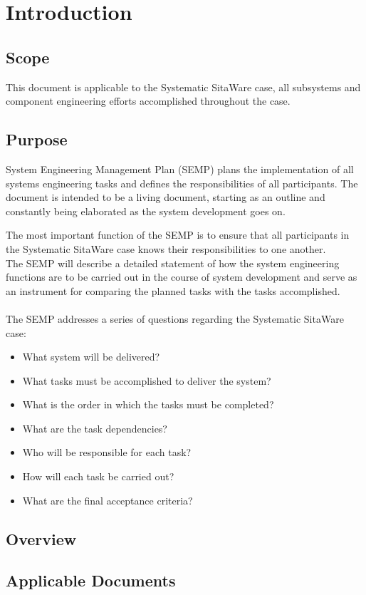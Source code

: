 %
\thispagestyle{fancy}
\chapter{Introduction}
\label{chp:intro}


\section{Scope}
This document is applicable to the Systematic SitaWare case, all subsystems and component engineering efforts accomplished throughout the case.

\section{Purpose}
System Engineering Management Plan (SEMP) plans the implementation of all systems engineering tasks and defines the responsibilities of all participants.
The document is intended to be a living document, starting as an outline and constantly being elaborated as the system development goes on.

The most important function of the SEMP is to ensure that all participants in the Systematic SitaWare case knows their responsibilities to one another. \\
The SEMP will describe a detailed statement of how the system engineering functions are to be carried out in the course of system development and serve as an instrument for comparing the planned tasks with the tasks accomplished.\\\\
The SEMP addresses a series of questions regarding the Systematic SitaWare case:
\begin{itemize}
    \item What system will be delivered?
    \item What tasks must be accomplished to deliver the system?
    \item What is the order in which the tasks must be completed?
    \item What are the task dependencies?
    \item Who will be responsible for each task?
    \item How will each task be carried out?
    \item What are the final acceptance criteria?
\end{itemize}

\section{Overview}


\section{Applicable Documents}
